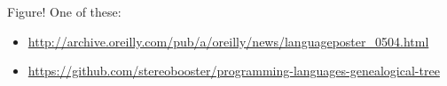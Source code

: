 Figure! One of these:

\begin{itemize}
	\item \href{http://archive.oreilly.com/pub/a/oreilly/news/languageposter\_0504.html}{http://archive.oreilly.com/pub/a/oreilly/news/languageposter\_0504.html}

	\item \href{https://github.com/stereobooster/programming-languages-genealogical-tree}{https://github.com/stereobooster/programming-languages-genealogical-tree}
\end{itemize}


